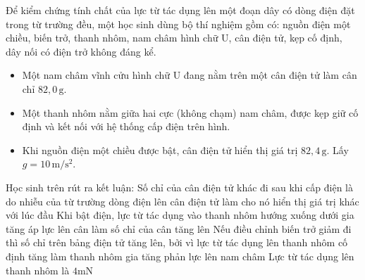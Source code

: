 \documentclass[12pt,a4paper]{article}
\begin{document}
\begin{ex}
	Để kiểm chứng tính chất của lực từ tác dụng lên một đoạn dây có dòng điện đặt trong từ trường đều, một học sinh dùng bộ thí nghiệm gồm có: nguồn điện một chiều, biến trở, thanh nhôm, nam châm hình chữ U, cân điện tử, kẹp cố định, dây nối có điện trở không đáng kể.
	\begin{itemize}
		\item Một nam châm vĩnh cửu hình chữ U đang nằm trên một cân điện tử làm cân chỉ $82{,}0 \, \mathrm{g}$.
		\item Một thanh nhôm nằm giữa hai cực (không chạm) nam châm, được kẹp giữ cố định và kết nối với hệ thống cấp điện trên hình.
		\item Khi nguồn điện một chiều được bật, cân điện tử hiển thị giá trị $82{,}4 \, \mathrm{g}$. Lấy $g = 10 \, \mathrm{m/s^2}$.
	\end{itemize}
	Học sinh trên rút ra kết luận:
	\choiceTF
	{Số chỉ của cân điện tử khác đi sau khi cấp điện là do nhiễu của từ trường dòng điện lên cân điện tử làm cho nó hiển thị giá trị khác với lúc đầu}
	{Khi bật điện, lực từ tác dụng vào thanh nhôm hướng xuống dưới gia tăng áp lực lên cân làm số chỉ của cân tăng lên}
	{Nếu điều chỉnh biến trở giảm đi thì số chỉ trên bảng điện tử tăng lên, bởi vì lực từ tác dụng lên thanh nhôm cố định tăng làm thanh nhôm gia tăng phản lực lên nam châm}
	{Lực từ tác dụng lên thanh nhôm là $4 \mathrm{mN}$}
\end{ex}
\end{document}
